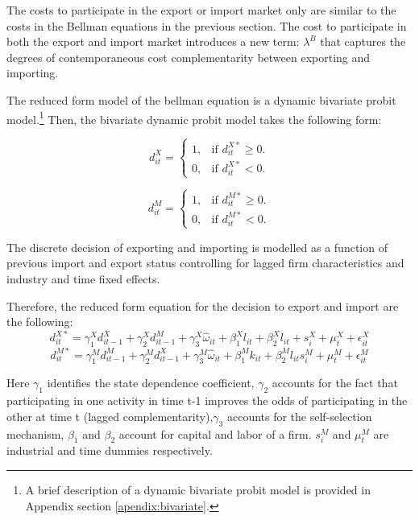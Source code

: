 \documentclass[12pt]{article}
\begin{document}
The costs to participate in the export or import market only are
similar to the costs in the Bellman equations in the previous
section. The cost to participate in both the export and import market
introduces a new term: $\lambda^B$  that captures the degrees of
contemporaneous cost complementarity between exporting and importing. 

The reduced form model of the bellman equation is a dynamic bivariate
probit model.\footnote{A
  brief description of a dynamic bivariate probit model is
  provided in Appendix section \ref{apendix:bivariate}.}  Then, the bivariate dynamic probit model  takes the following form:

\begin{equation}
  d_{it}^{X}=\begin{cases}
   1 , & \text{if $d_{it}^{X*}\geq 0$}.\\
   0 , & \text{if $d_{it}^{X*}<  0$}.
  \end{cases}
\end{equation}

\begin{equation}
  d_{it}^{M}=\begin{cases}
   1 , & \text{if $d_{it}^{M*} \geq  0$}.\\
   0 , & \text{if $d_{it}^{M*}<  0$}.
  \end{cases}
\end{equation}

The discrete decision of exporting and importing is modelled as a function of previous import and
export status controlling for lagged firm characteristics and industry and time fixed
effects. 

Therefore, the reduced form equation for the decision to export and
import are the following: 
\begin{equation}
d_{it}^{X*} = \gamma_{1}^{X} d_{it-1}^{X} + \gamma_{2}^{X} d_{it-1}^{M}+
\gamma_{3}^{X} \hat{\omega}_{it}  + \beta_{1}^{X}l_{it}  +\beta_{2}^{X}l_{it}+
s_{i}^{X} + \mu_{t}^{X}  + \epsilon_{it}^{X}
\end{equation}
\begin{equation}
d_{it}^{M*} = \gamma_{1}^{M} d_{it-1}^{M} + \gamma_{2}^{M} d_{it-1}^{X}+
\gamma_{3}^{M} \hat{\omega}_{it}  + \beta_{1}^{M}k_{it}  +\beta_{2}^{M}l_{it}
s_{i}^{M} + \mu_{t}^{M}  + \epsilon_{it}^{M}
\end{equation}

Here $\gamma_{1}$ identifies the state dependence coefficient, $\gamma_{2}$ accounts for
the fact that participating in one activity in time t-1 improves the
odds of participating in the other at time t (lagged complementarity),$\gamma_{3}$ accounts for
the self-selection mechanism, $\beta_{1}$ and $\beta_{2}$ account for
capital and labor of a firm.  $s_{i}^{M}$  and $\mu_{t}^{M}$ are industrial
and time dummies respectively.
\end{document}
